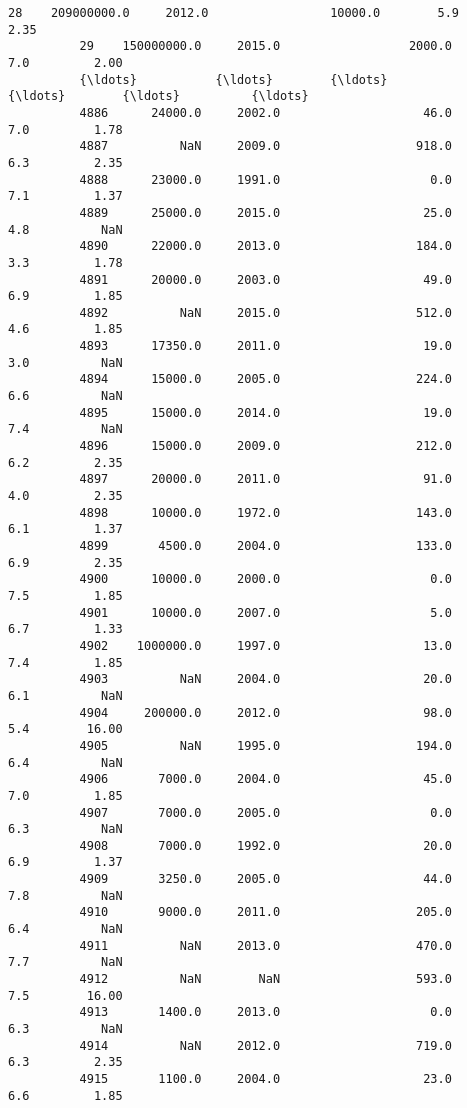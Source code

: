 \documentclass[11pt]{article}
\begin{document}
\begin{Verbatim}[commandchars=\\\{\}]
          28    209000000.0     2012.0                 10000.0        5.9         2.35   
          29    150000000.0     2015.0                  2000.0        7.0         2.00   
          {\ldots}           {\ldots}        {\ldots}                     {\ldots}        {\ldots}          {\ldots}   
          4886      24000.0     2002.0                    46.0        7.0         1.78   
          4887          NaN     2009.0                   918.0        6.3         2.35   
          4888      23000.0     1991.0                     0.0        7.1         1.37   
          4889      25000.0     2015.0                    25.0        4.8          NaN   
          4890      22000.0     2013.0                   184.0        3.3         1.78   
          4891      20000.0     2003.0                    49.0        6.9         1.85   
          4892          NaN     2015.0                   512.0        4.6         1.85   
          4893      17350.0     2011.0                    19.0        3.0          NaN   
          4894      15000.0     2005.0                   224.0        6.6          NaN   
          4895      15000.0     2014.0                    19.0        7.4          NaN   
          4896      15000.0     2009.0                   212.0        6.2         2.35   
          4897      20000.0     2011.0                    91.0        4.0         2.35   
          4898      10000.0     1972.0                   143.0        6.1         1.37   
          4899       4500.0     2004.0                   133.0        6.9         2.35   
          4900      10000.0     2000.0                     0.0        7.5         1.85   
          4901      10000.0     2007.0                     5.0        6.7         1.33   
          4902    1000000.0     1997.0                    13.0        7.4         1.85   
          4903          NaN     2004.0                    20.0        6.1          NaN   
          4904     200000.0     2012.0                    98.0        5.4        16.00   
          4905          NaN     1995.0                   194.0        6.4          NaN   
          4906       7000.0     2004.0                    45.0        7.0         1.85   
          4907       7000.0     2005.0                     0.0        6.3          NaN   
          4908       7000.0     1992.0                    20.0        6.9         1.37   
          4909       3250.0     2005.0                    44.0        7.8          NaN   
          4910       9000.0     2011.0                   205.0        6.4          NaN   
          4911          NaN     2013.0                   470.0        7.7          NaN   
          4912          NaN        NaN                   593.0        7.5        16.00   
          4913       1400.0     2013.0                     0.0        6.3          NaN   
          4914          NaN     2012.0                   719.0        6.3         2.35   
          4915       1100.0     2004.0                    23.0        6.6         1.85   
          

\end{Verbatim}
\end{document}
